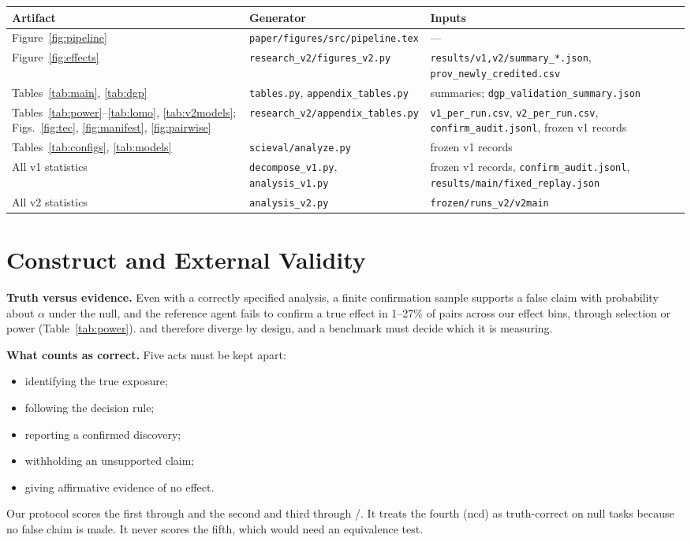 \begin{center}\footnotesize
\begin{tabular}{p{4.2cm}p{5.0cm}p{5.0cm}}
\toprule
Artifact & Generator & Inputs\\
\midrule
Figure~\ref{fig:pipeline} & \texttt{paper/figures/src/pipeline.tex} & ---\\
Figure~\ref{fig:effects} & \texttt{research\_v2/figures\_v2.py} & \texttt{results/v1,v2/summary\_*.json}, \texttt{prov\_newly\_credited.csv}\\
Tables~\ref{tab:main}, \ref{tab:dgp} & \texttt{tables.py}, \texttt{appendix\_tables.py} & summaries; \texttt{dgp\_validation\_summary.json}\\
Tables~\ref{tab:power}--\ref{tab:lomo}, \ref{tab:v2models}; Figs.~\ref{fig:tec}, \ref{fig:manifest}, \ref{fig:pairwise} & \texttt{research\_v2/appendix\_tables.py} & \texttt{v1\_per\_run.csv}, \texttt{v2\_per\_run.csv}, \texttt{confirm\_audit.jsonl}, frozen v1 records\\
Tables~\ref{tab:configs}, \ref{tab:models} & \texttt{scieval/analyze.py} & frozen v1 records\\
All v1 statistics & \texttt{decompose\_v1.py}, \texttt{analysis\_v1.py} & frozen v1 records, \texttt{confirm\_audit.jsonl}, \texttt{results/main/fixed\_replay.json}\\
All v2 statistics & \texttt{analysis\_v2.py} & \texttt{frozen/runs\_v2/v2main}\\
\bottomrule
\end{tabular}
\end{center}

\section{Construct and External Validity}
\label{app:validity}

\textbf{Truth versus evidence.} Even with a correctly specified analysis, a
finite confirmation sample supports a false claim with probability about
$\alpha$ under the null, and the reference agent fails to confirm a true effect in 1--27\% of
pairs across our effect bins, through selection or power (Table~\ref{tab:power}).  and
 therefore diverge by design, and a benchmark must decide which
it is measuring.

\textbf{What counts as correct.} Five acts must be kept apart:
\begin{itemize}
\item identifying the true exposure;
\item following the decision rule;
\item reporting a confirmed discovery;
\item withholding an unsupported claim;
\item giving affirmative evidence of no effect.
\end{itemize}
Our protocol scores the first through  and the second and third
through /. It treats the fourth (ncd) as
truth-correct on null tasks because no false claim is made. It never scores
the fifth, which would need an equivalence test.

